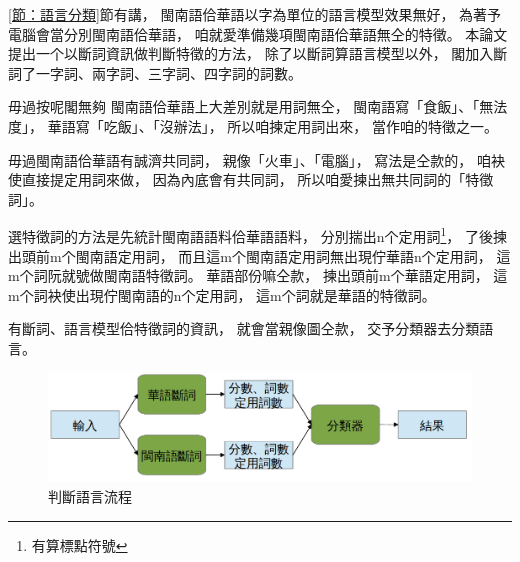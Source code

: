 \ref{節：語言分類}節有講，
閩南語佮華語以字為單位的語言模型效果無好，
為著予電腦會當分別閩南語佮華語，
咱就愛準備幾項閩南語佮華語無仝的特徵。
本論文提出一个以斷詞資訊做判斷特徵的方法，
除了以斷詞算語言模型以外，
閣加入斷詞了一字詞、兩字詞、三字詞、四字詞的詞數。

毋過按呢閣無夠
閩南語佮華語上大差別就是用詞無仝，
閩南語寫「食飯」、「無法度」，
華語寫「吃飯」、「沒辦法」，
所以咱揀定用詞出來，
當作咱的特徵之一。

毋過閩南語佮華語有誠濟共同詞，
親像「火車」、「電腦」，
寫法是仝款的，
咱袂使直接提定用詞來做，
因為內底會有共同詞，
所以咱愛揀出無共同詞的「特徵詞」。

選特徵詞的方法是先統計閩南語語料佮華語語料，
分別揣出n个定用詞\footnote{有算標點符號}，
了後揀出頭前m个閩南語定用詞，
而且這m个閩南語定用詞無出現佇華語n个定用詞，
這m个詞阮就號做閩南語特徵詞。
華語部份嘛仝款，
揀出頭前m个華語定用詞，
這m个詞袂使出現佇閩南語的n个定用詞，
這m个詞就是華語的特徵詞。

有斷詞、語言模型佮特徵詞的資訊，
就會當親像圖\label{圖：判斷語言架構}仝款，
交予分類器去分類語言。


\begin{figure}
\centerline{\includegraphics[keepaspectratio,width=40em]{圖/判斷語言架構}}
\caption{判斷語言流程}
\label{圖：判斷語言架構}
\end{figure}

